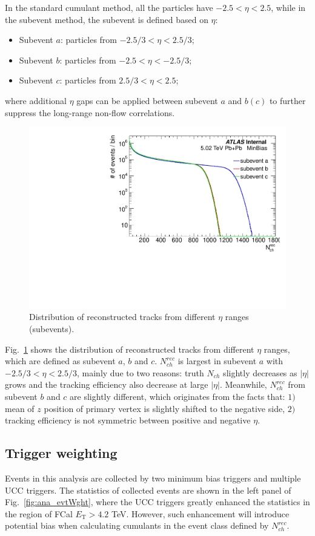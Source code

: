 In the standard cumulant method, all the particles have $-2.5<\eta<2.5$, while in the subevent method, the subevent is defined based on $\eta$:
\begin{itemize}
\item Subevent $a$: particles from $-2.5/3<\eta<2.5/3$;
\item Subevent $b$: particles from $-2.5<\eta<-2.5/3$;
\item Subevent $c$: particles from $2.5/3<\eta<2.5$;
\end{itemize}
where additional $\eta$ gaps can be applied between subevent $a$ and $b(c)$ to further suppress the long-range non-flow correlations.

\begin{figure}[H]
\centering
\includegraphics[width=.75\linewidth]{figs/sec_ana/cumuPhase_nTrkSub.pdf}
\caption{Distribution of reconstructed tracks from different $\eta$ ranges (subevents).}
\label{fig:cumuAna_PHASE_sub}
\end{figure}
Fig.~\ref{fig:cumuAna_PHASE_sub} shows the distribution of reconstructed tracks from different $\eta$ ranges, which are defined as subevent $a$, $b$ and $c$. $N_{ch}^{rec}$ is largest in subevent $a$ with $-2.5/3<\eta<2.5/3$, mainly due to two reasons: truth $N_{ch}$ slightly decreases as $|\eta|$ grows and the tracking efficiency also decrease at large $|\eta|$. Meanwhile, $N_{ch}^{rec}$ from subevent $b$ and $c$ are slightly different, which originates from the facts that: $1)$ mean of $z$ position of primary vertex is slightly shifted to the negative side, $2)$ tracking efficiency is not symmetric between positive and negative $\eta$.



\subsection{Trigger weighting}
Events in this analysis are collected by two minimum bias triggers and multiple UCC triggers. The statistics of collected events are shown in the left panel of Fig.~\ref{fig:ana_evtWght}, where the UCC triggers greatly enhanced the statistics in the region of FCal $E_\text{T}>4.2$ TeV. However, such enhancement will introduce potential bias when calculating cumulants in the event class defined by $N_{ch}^{rec}$. 

